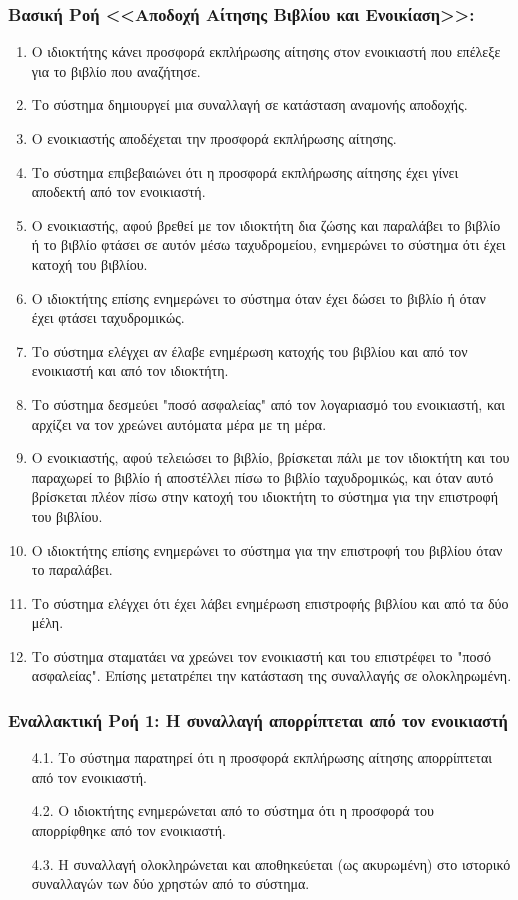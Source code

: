 \documentclass[12pt,a4paper]{article}
\begin{document}
\subsubsection*{Βασική Ροή <<Αποδοχή Αίτησης Βιβλίου και Ενοικίαση>>:}
\begin{enumerate}
    \item Ο ιδιοκτήτης κάνει προσφορά εκπλήρωσης αίτησης στον ενοικιαστή που επέλεξε για το βιβλίο που αναζήτησε.
    \item Το σύστημα δημιουργεί μια συναλλαγή σε κατάσταση αναμονής αποδοχής.
    \item Ο ενοικιαστής αποδέχεται την προσφορά εκπλήρωσης αίτησης.
    \item Το σύστημα επιβεβαιώνει ότι η προσφορά εκπλήρωσης αίτησης έχει γίνει αποδεκτή από τον ενοικιαστή.
    \item Ο ενοικιαστής, αφού βρεθεί με τον ιδιοκτήτη δια ζώσης και παραλάβει το βιβλίο ή το βιβλίο φτάσει σε αυτόν μέσω ταχυδρομείου, ενημερώνει το σύστημα ότι έχει κατοχή του βιβλίου. 
    \item Ο ιδιοκτήτης επίσης ενημερώνει το σύστημα όταν έχει δώσει το βιβλίο ή όταν έχει φτάσει ταχυδρομικώς.
    \item Το σύστημα ελέγχει αν έλαβε ενημέρωση κατοχής του βιβλίου και από τον ενοικιαστή και από τον ιδιοκτήτη.
    \item Το σύστημα δεσμεύει "ποσό ασφαλείας" από τον λογαριασμό του ενοικιαστή, και αρχίζει να τον χρεώνει αυτόματα μέρα με τη μέρα.
    \item Ο ενοικιαστής, αφού τελειώσει το βιβλίο, βρίσκεται πάλι με τον ιδιοκτήτη και του παραχωρεί το βιβλίο ή αποστέλλει πίσω το βιβλίο ταχυδρομικώς, και όταν αυτό βρίσκεται πλέον πίσω στην κατοχή του ιδιοκτήτη το σύστημα για την επιστροφή του βιβλίου.
    \item Ο ιδιοκτήτης επίσης ενημερώνει το σύστημα για την επιστροφή του βιβλίου όταν το παραλάβει.
    \item Το σύστημα ελέγχει ότι έχει λάβει ενημέρωση επιστροφής βιβλίου και από τα δύο μέλη. 
    \item Το σύστημα σταματάει να χρεώνει τον ενοικιαστή και του επιστρέφει το "ποσό ασφαλείας". Επίσης μετατρέπει την κατάσταση της συναλλαγής σε ολοκληρωμένη.
\end{enumerate}

\subsubsection*{Εναλλακτική Ροή 1: Η συναλλαγή απορρίπτεται από τον ενοικιαστή}
\begin{enumerate}
    \item[4.1.] Το σύστημα παρατηρεί ότι η προσφορά εκπλήρωσης αίτησης απορρίπτεται από τον ενοικιαστή.
    \item[4.2.] Ο ιδιοκτήτης ενημερώνεται από το σύστημα ότι η προσφορά του απορρίφθηκε από τον ενοικιαστή.
    \item[4.3.] Η συναλλαγή ολοκληρώνεται και αποθηκεύεται (ως ακυρωμένη) στο ιστορικό συναλλαγών των δύο χρηστών από το σύστημα.
\end{enumerate}
\end{document}
